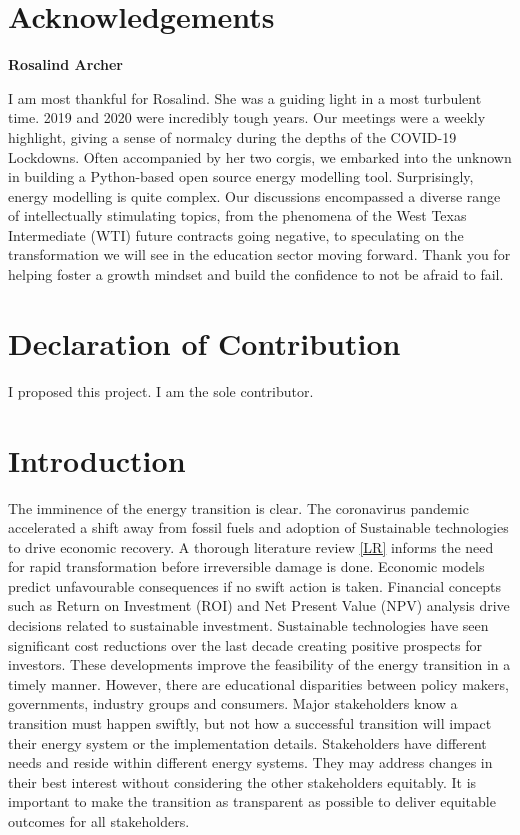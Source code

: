 \documentclass[12pt]{article}
\begin{document}
\section*{Acknowledgements}
\begin{center}
	\textbf{Rosalind Archer}
\end{center}
I am most thankful for Rosalind. She was a guiding light in a most turbulent time.
2019 and 2020 were incredibly tough years.
Our meetings were a weekly highlight, giving a sense of normalcy during the depths of the COVID-19 Lockdowns.
Often accompanied by her two corgis, we embarked into the unknown in building a Python-based open source energy modelling tool.
Surprisingly, energy modelling is quite complex.
Our discussions encompassed a diverse range of intellectually stimulating topics, 
from the phenomena of the West Texas Intermediate (WTI) future contracts going negative,
to speculating on the transformation we will see in the education sector moving forward.
Thank you for helping foster a growth mindset and build the confidence to not be afraid to fail.

\newpage
\section*{Declaration of Contribution}
I proposed this project. I am the sole contributor.

\newpage
\tableofcontents
\newpage
\listoffigures
\listoftables
\newpage
\section{Introduction}
The imminence of the energy transition is clear.
The coronavirus pandemic accelerated a shift away from fossil fuels and adoption of Sustainable technologies to drive economic recovery.
A thorough literature review \ref{LR} informs the need for rapid transformation before irreversible damage is done.
Economic models predict unfavourable consequences if no swift action is taken.
Financial concepts such as Return on Investment (ROI) and Net Present Value (NPV) analysis drive decisions related to sustainable investment.
Sustainable technologies have seen significant cost reductions over the last decade creating positive prospects for investors.
These developments improve the feasibility of the energy transition in a timely manner.
However, there are educational disparities between policy makers, governments, industry groups and consumers.
Major stakeholders know a transition must happen swiftly, but not how a successful transition will impact their energy system or the implementation details.
Stakeholders have different needs and reside within different energy systems. 
They may address changes in their best interest without considering the other stakeholders equitably.
It is important to make the transition as transparent as possible to deliver equitable outcomes for all stakeholders.
\end{document}

